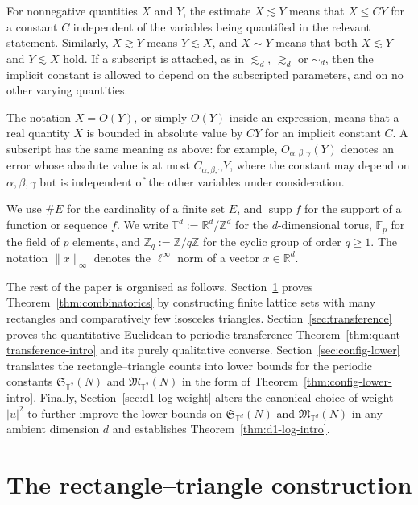 \documentclass[10pt,a4paper]{amsart}
\numberwithin{equation}{section}
\newcommand{\norm}[1]{\lVert #1\rVert_\infty}
\newcommand{\supp}{\operatorname{supp}}
\renewcommand{\leq}{\leqslant}
\renewcommand{\geq}{\geqslant}
\begin{document}
For nonnegative quantities $X$ and $Y$, the estimate $X\lesssim Y$ means that $X\leq CY$ for a constant $C$ independent of the variables being quantified in the relevant statement. Similarly, $X\gtrsim Y$ means $Y\lesssim X$, and $X\sim Y$ means that both $X\lesssim Y$ and $Y\lesssim X$ hold. If a subscript is attached, as in $\lesssim_d$, $\gtrsim_d$ or $\sim_d$, then the implicit constant is allowed to depend on the subscripted parameters, and on no other varying quantities. 

The notation $X=O(Y)$, or simply $O(Y)$ inside an expression, means that a real quantity $X$ is bounded in absolute value by $CY$ for an implicit constant $C$. A subscript has the same meaning as above: for example, $O_{\alpha,\beta,\gamma}(Y)$ denotes an error whose absolute value is at most $C_{\alpha,\beta,\gamma}Y$, where the constant may depend on $\alpha,\beta,\gamma$ but is independent of the other variables under consideration.

We use $\#E$ for the cardinality of a finite set $E$, and $\supp f$ for the support of a function or sequence $f$. We write $\mathbb{T}^d := \mathbb{R}^d/\mathbb{Z}^d$ for the $d$-dimensional torus, $\mathbb{F}_p$ for the field of $p$ elements, and $\mathbb{Z}_q := \mathbb{Z}/q\mathbb{Z}$ for the cyclic group of order $q\geq1$. The notation $\norm{x}$ denotes the $\ell^\infty$ norm of a vector $x\in\mathbb{R}^d$.

The rest of the paper is organised as follows. Section~\ref{sec:rectangle-triangle} proves Theorem~\ref{thm:combinatorics} by constructing finite lattice sets with many rectangles and comparatively few isosceles triangles. Section~\ref{sec:transference} proves the quantitative Euclidean-to-periodic transference Theorem~\ref{thm:quant-transference-intro} and its purely qualitative converse. Section~\ref{sec:config-lower} translates the rectangle--triangle counts into lower bounds for the periodic constants $\mathfrak{S}_{\mathbb{T}^2}(N)$ and $\mathfrak{M}_{\mathbb{T}^2}(N)$ in the form of Theorem~\ref{thm:config-lower-intro}. Finally, Section~\ref{sec:d1-log-weight} alters the canonical choice of weight $|u|^2$ to further improve the lower bounds on $\mathfrak{S}_{\mathbb{T}^d}(N)$ and $\mathfrak{M}_{\mathbb{T}^d}(N)$ in any ambient dimension $d$ and establishes Theorem~\ref{thm:d1-log-intro}.


\section{The rectangle--triangle construction}
\label{sec:rectangle-triangle}
\end{document}
